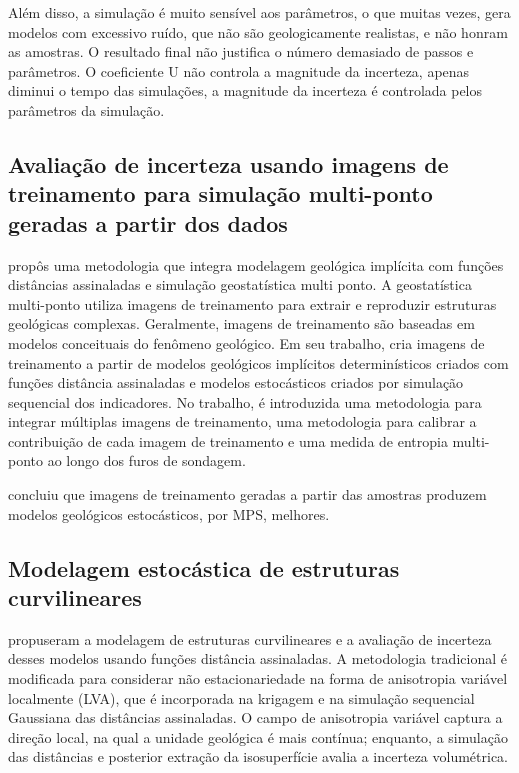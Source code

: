 Além disso, a simulação é muito sensível aos parâmetros, o que muitas vezes, gera modelos com excessivo ruído, que não são geologicamente realistas, e não honram as amostras. O resultado final não justifica o número demasiado de passos e parâmetros. O coeficiente U não controla a magnitude da incerteza, apenas diminui o tempo das simulações, a magnitude da incerteza é controlada pelos parâmetros da simulação.

\subsection{Avaliação de incerteza usando imagens de treinamento para simulação multi-ponto geradas a partir dos dados}

 propôs uma metodologia que integra modelagem geológica implícita com funções distâncias assinaladas e simulação geostatística multi ponto. A geostatística multi-ponto utiliza imagens de treinamento para extrair e reproduzir estruturas geológicas complexas. Geralmente, imagens de treinamento são baseadas em modelos conceituais do fenômeno geológico. Em seu trabalho,  cria imagens de treinamento a partir de modelos geológicos implícitos determinísticos criados com funções distância assinaladas e modelos estocásticos criados por simulação sequencial dos indicadores. No trabalho, é introduzida uma metodologia  para integrar múltiplas imagens de treinamento, uma metodologia para calibrar a contribuição de cada imagem de treinamento e uma medida de entropia multi-ponto ao longo dos furos de sondagem.

 concluiu que imagens de treinamento geradas a partir das amostras produzem modelos geológicos estocásticos, por MPS, melhores.

\subsection{Modelagem estocástica de estruturas curvilineares} 

 propuseram a modelagem de estruturas curvilineares e a avaliação de incerteza desses modelos usando funções distância assinaladas. A metodologia tradicional é modificada para considerar não estacionariedade na forma de anisotropia variável localmente (LVA), que é incorporada na krigagem e na simulação sequencial Gaussiana das distâncias assinaladas. O campo de anisotropia variável captura a direção local, na qual a unidade geológica é mais contínua; enquanto, a simulação das distâncias e posterior extração da isosuperfície avalia a incerteza volumétrica.

